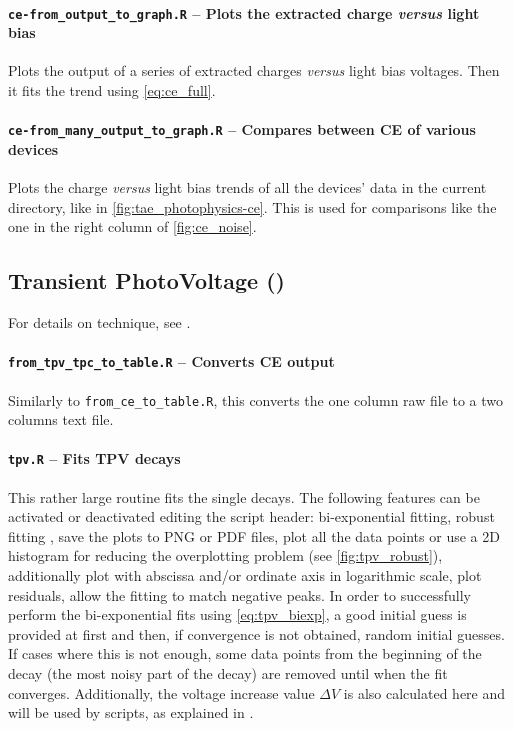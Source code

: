 		\paragraph{\texttt{ce-\-from\_output\_to\_graph.R} -- Plots the extracted charge \textsl{versus} light bias}
		Plots the output of a series of extracted charges \textsl{versus} light bias voltages.
		Then it fits the trend using \cref{eq:ce_full}.

		\paragraph{\texttt{ce-\-from\_many\_output\_to\_graph.R} -- Compares between CE of various devices}
		Plots the charge \textsl{versus} light bias trends of all the devices' data in the current directory, like in \cref{fig:tae_photophysics-ce}.
		This is used for comparisons like the one in the right column of \cref{fig:ce_noise}.
		
	\subsection{Transient PhotoVoltage ()}\label{r_tpv}
		For details on  technique, see .

		\paragraph{\texttt{from\_tpv\_tpc\_to\_table.R} -- Converts CE output}
		Similarly to \texttt{from\_ce\_to\_table.R}, this converts the one column raw file to a two columns text file.

		\paragraph{\texttt{tpv.R} -- Fits TPV decays}
		This rather large routine fits the single  decays.
		The following features can be activated or deactivated editing the script header:
		bi-exponential fitting, robust fitting \cite{Maechler2018}, save the plots to PNG or PDF files, plot all the data points or use a 2D histogram for reducing the overplotting problem (see \cref{fig:tpv_robust}), additionally plot with abscissa and/or ordinate axis in logarithmic scale, plot residuals, allow the fitting to match negative peaks.
		In order to successfully perform the bi-exponential fits using \cref{eq:tpv_biexp}, a good initial guess is provided at first and then, if convergence is not obtained, random initial guesses.
		If cases where this is not enough, some data points from the beginning of the decay (the most noisy part of the decay) are removed until when the fit converges.
		Additionally, the voltage increase value $\Delta V$ is also calculated here and will be used by  scripts, as explained in .

